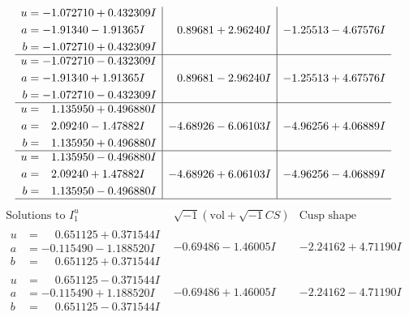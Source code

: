 \documentclass[1p]{elsarticle_modified}
\theoremstyle{definition}
\newcommand{\I}{\sqrt{-1}}
\begin{document}
$$\begin{array}{c|c|c}
\begin{aligned}
u &= -1.072710 + 0.432309 I \\
a &= -1.91340 - 1.91365 I \\
b &= -1.072710 + 0.432309 I\end{aligned}
 & \phantom{-}0.89681 + 2.96240 I & -1.25513 - 4.67576 I \\ \hline\begin{aligned}
u &= -1.072710 - 0.432309 I \\
a &= -1.91340 + 1.91365 I \\
b &= -1.072710 - 0.432309 I\end{aligned}
 & \phantom{-}0.89681 - 2.96240 I & -1.25513 + 4.67576 I \\ \hline\begin{aligned}
u &= \phantom{-}1.135950 + 0.496880 I \\
a &= \phantom{-}2.09240 - 1.47882 I \\
b &= \phantom{-}1.135950 + 0.496880 I\end{aligned}
 & -4.68926 - 6.06103 I & -4.96256 + 4.06889 I \\ \hline\begin{aligned}
u &= \phantom{-}1.135950 - 0.496880 I \\
a &= \phantom{-}2.09240 + 1.47882 I \\
b &= \phantom{-}1.135950 - 0.496880 I\end{aligned}
 & -4.68926 + 6.06103 I & -4.96256 - 4.06889 I\\
 \hline 
 \end{array}$$\newpage$$\begin{array}{c|c|c}  
\text{Solutions to }I^u_{1}& \I (\text{vol} + \sqrt{-1}CS) & \text{Cusp shape}\\
 \hline 
\begin{aligned}
u &= \phantom{-}0.651125 + 0.371544 I \\
a &= -0.115490 - 1.188520 I \\
b &= \phantom{-}0.651125 + 0.371544 I\end{aligned}
 & -0.69486 - 1.46005 I & -2.24162 + 4.71190 I \\ \hline\begin{aligned}
u &= \phantom{-}0.651125 - 0.371544 I \\
a &= -0.115490 + 1.188520 I \\
b &= \phantom{-}0.651125 - 0.371544 I\end{aligned}
 & -0.69486 + 1.46005 I & -2.24162 - 4.71190 I \\ \hline\begin{aligned}

\end{aligned}
\end{array}$$
\end{document}
